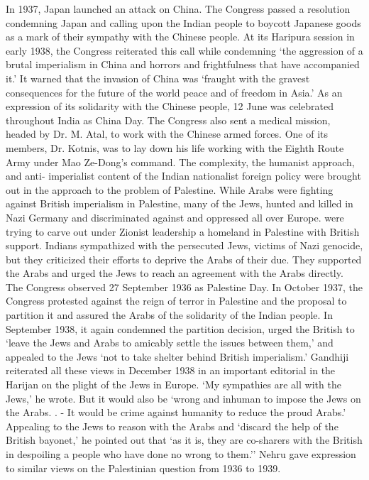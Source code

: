 In 1937, Japan launched an attack on China. The Congress passed a resolution condemning Japan and calling upon the Indian people to boycott Japanese goods as a mark of their sympathy with the Chinese people. At its Haripura session in early 1938, the Congress reiterated this call while condemning `the aggression of a brutal imperialism in China and horrors and frightfulness that have accompanied it.' It warned that the invasion of China was `fraught with the gravest consequences for the future of the world peace and of freedom in Asia.' As an expression of its solidarity with the Chinese people, 12 June was celebrated throughout India as China Day. The Congress also sent a medical mission, headed by Dr. M. Atal, to work with the Chinese armed forces. One of its members, Dr. Kotnis, was to lay down his life working with the Eighth Route Army under Mao Ze-Dong's command. The complexity, the humanist approach, and anti- imperialist content of the Indian nationalist foreign policy were brought out in the approach to the problem of Palestine. While Arabs were fighting against British imperialism in Palestine, many of the Jews, hunted and killed in Nazi Germany and discriminated against and oppressed all over Europe. were trying to carve out under Zionist leadership a homeland in Palestine with British support. Indians sympathized with the persecuted Jews, victims of Nazi genocide, but they criticized their efforts to deprive the Arabs of their due. They supported the Arabs and urged the Jews to reach an agreement with the Arabs directly. The Congress observed 27 September 1936 as Palestine Day. In October 1937, the Congress protested against the reign of terror in Palestine and the proposal to partition it and assured the Arabs of the solidarity of the Indian people. In September 1938, it again condemned the partition decision, urged the British to `leave the Jews and Arabs to amicably settle the issues between them,' and appealed to the Jews `not to take shelter behind British imperialism.' Gandhiji reiterated all these views in December 1938 in an important editorial in the Harijan on the plight of the Jews in Europe. `My sympathies are all with the Jews,' he wrote. But it would also be `wrong and inhuman to impose the Jews on the Arabs. . - It would be crime against humanity to reduce the proud Arabs.' Appealing to the Jews to reason with the Arabs and `discard the help of the British bayonet,' he pointed out that `as it is, they are co-sharers with the British in despoiling a people who have done no wrong to them.'' Nehru gave expression to similar views on the Palestinian question from 1936 to 1939. 

